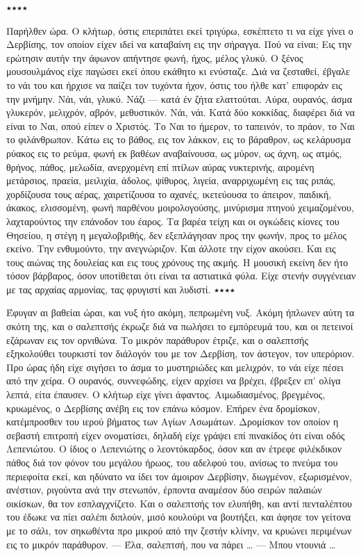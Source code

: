 \documentclass{article}
\begin{document}
٭٭٭٭

Παρήλθεν ώρα. Ο κλήτωρ, όστις επεριπάτει εκεί τριγύρω, εσκέπτετο τι να είχε γίνει ο Δερβίσης, τον οποίον είχεν ιδεί να καταβαίνη εις την σήραγγα.
Πού να είναι;
Εις την ερώτησιν αυτήν την άφωνον απήντησε φωνή, ήχος, μέλος γλυκύ.
Ο ξένος μουσουλμάνος είχε παγώσει εκεί όπου εκάθητο κι ενύσταζε. Διά να ζεσταθεί, έβγαλε το νάι του και ήρχισε να παίζει τον τυχόντα ήχον, όστις του ήλθε κατ’ επιφοράν εις την μνήμην.
Νάι, νάι, γλυκύ.
Νάζι — κατά έν ζήτα ελαττούται.
Αύρα, ουρανός, άσμα γλυκερόν, μελιχρόν, αβρόν, μεθυστικόν.
Νάι, νάι.
Κατά δύο κοκκίδας, διαφέρει διά να είναι το Ναι, οπού είπεν ο Χριστός.
Το Ναι το ήμερον, το ταπεινόν, το πράον, το Ναι το φιλάνθρωπον.
Κάτω εις το βάθος, εις τον λάκκον, εις το βάραθρον, ως κελάρυσμα ρύακος εις το ρεύμα, φωνή εκ βαθέων αναβαίνουσα, ως μύρον, ως άχνη, ως ατμός, θρήνος, πάθος, μελωδία, ανερχομένη επί πτίλων αύρας νυκτερινής, αιρομένη μετάρσιος, πραεία, μειλιχία, άδολος, ψίθυρος, λιγεία, αναρριχωμένη εις τας ριπάς, χορδίζουσα τους αέρας, χαιρετίζουσα το αχανές, ικετεύουσα το άπειρον, παιδική, άκακος, ελισσομένη, φωνή παρθένου μοιρολογούσης, μινύρισμα πτηνού χειμαζομένου, λαχταρούντος την επάνοδον του έαρος.
Τα βαρέα τείχη και οι ογκώδεις κίονες του Θησείου, η στέγη η μεγαλοβριθής, δεν εξεπλάγησαν προς την φωνήν, προς το μέλος εκείνο. Την ενθυμούντο, την ανεγνώριζον. Και άλλοτε την είχον ακούσει. Και εις τους αιώνας της δουλείας και εις τους χρόνους της ακμής.
Η μουσική εκείνη δεν ήτο τόσον βάρβαρος, όσον υποτίθεται ότι είναι τα αστιατικά φύλα. Είχε στενήν συγγένειαν με τας αρχαίας αρμονίας, τας φρυγιστί και λυδιστί.
٭٭٭٭

Έφυγαν αι βαθείαι ώραι, και νυξ ήτο ακόμη, πεπρωμένη νυξ.
Ακόμη ήπλωνεν αύτη τα σκότη της, και ο σαλεπτσής έκρωζε διά να πωλήσει το εμπόρευμά του, και οι πετεινοί εζάρωναν εις τον ορνιθώνα. Το μικρόν παράθυρον έτριζε, και ο σαλεπτσής εξηκολούθει τουρκιστί τον διάλογόν του με τον Δερβίση, τον άστεγον, τον υπερόριον.
Προ ώρας ήδη είχε σιγήσει το άσμα το μυστηριώδες και μελιχρόν, το νάι είχε πέσει από την χείρα. Ο ουρανός, συννεφώδης, είχεν αρχίσει να βρέχει, έβρεξεν επ’ ολίγα λεπτά, είτα έπαυσεν. Ο κλήτωρ είχε γίνει άφαντος. Αιμωδιασμένος, βρεγμένος, κρυωμένος, ο Δερβίσης ανέβη εις τον επάνω κόσμον.
Επήρεν ένα δρομίσκον, κατέμπροσθεν του ιερού βήματος των Αγίων Ασωμάτων. Δρομίσκον τον οποίον η σεβαστή επιτροπή είχεν ονοματίσει, δηλαδή είχε γράψει επί πινακίδος ότι είναι οδός Λεπενιώτου.
Ο ίδιος ο Λεπενιώτης ο λεοντόκαρδος, όσον και αν έτρεφε φιλέκδικον πάθος διά τον φόνον του μεγάλου ήρωος, του αδελφού του, ανίσως το πνεύμα του περιεφοίτα εκεί, και ηδύνατο να ίδει τον άμοιρον Δερβίσην, διωγμένον, εξωρισμένον, ανέστιον, ριγούντα ανά την στενωπόν, έρποντα αναμέσον δύο σειρών παλαιών οικίσκων, θα τον εσπλαγχνίζετο.
Και ο σαλεπτσής τον ελυπήθη, και αντί πενταλέπτου του έδωκε να πίει σαλέπι διπλούν, μισό κουλούρι να βουτήξει, και άφησε τον γείτονα με το σάλι, τον σηκωθέντα προ μικρού από την ζεστήν κλίνην, να κρυώνει περιμένων εις το μικρόν παράθυρον.
—  Έλα, σαλεπτσή, που να πάρει …
—    Μπου ντουνιά …
\end{document}

